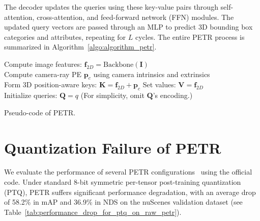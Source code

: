 The decoder updates the queries using these key-value pairs through self-attention, cross-attention, and feed-forward network (FFN) modules. The updated query vectors are passed through an MLP to predict 3D bounding box categories and attributes, repeating for $L$ cycles. The entire PETR process is summarized in Algorithm~\ref{algo:algorithm_petr}.
\begin{algorithm}[htb]
\SetAlgoLined
\DontPrintSemicolon
\SetNoFillComment
\SetInd{1em}{1em} %
\footnotesize


Compute image features: $\mathbf{f}_{2D} = \text{Backbone}(\mathbf{I})$\\
Compute camera-ray PE $\mathbf{p}_c$ using camera intrinsics and extrinsics\\
Form 3D position-aware keys: $\mathbf{K} = \mathbf{f}_{2D} + \mathbf{p}_c$ 
Set values: $\mathbf{V} = \mathbf{f}_{2D}$ \\
Initialize queries: $\mathbf{Q} = q$ (For simplicity, omit \(\mathbf{Q}\)'s encoding.)\\

\caption{Pseudo-code of PETR.}
\label{algo:algorithm_petr}
\end{algorithm}



\iffalse
\section{Quantization Failure of PETR}
\label{sec:quantization_failure_of_petr}

We evaluate the performance of several PETR configurations~\cite{liu2022petr} using the official code. Under standard 8-bit symmetric per-tensor post-training quantization (PTQ), PETR suffers significant performance degradation, with an average drop of 58.2\% in mAP and 36.9\% in NDS on the nuScenes validation dataset (see Table~\ref{tab:performance_drop_for_ptq_on_raw_petr}). 

